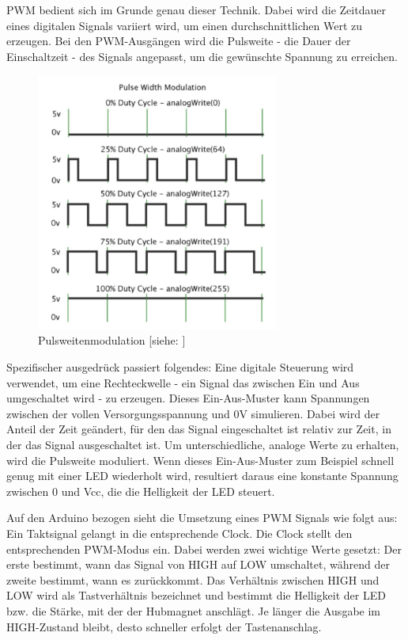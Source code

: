 \ac{PWM} bedient sich im Grunde genau dieser Technik.
Dabei wird die Zeitdauer eines digitalen Signals variiert wird, um einen durchschnittlichen Wert zu erzeugen.
Bei den \ac{PWM}-Ausgängen wird die Pulsweite - die Dauer der Einschaltzeit - des Signals angepasst, um die gewünschte Spannung zu erreichen.

\begin{figure}[htbp]
	\centering
	\includegraphics [width=8cm] {img/pulsweite}
	\caption{Pulsweitenmodulation [siehe: \cite*[siehe ][]{PWM}]}
	\label{fig:pulsweite}
\end{figure}

Spezifischer ausgedrück passiert folgendes:
Eine digitale Steuerung wird verwendet, um eine Rechteckwelle - ein Signal das zwischen Ein und Aus umgeschaltet wird - zu erzeugen.
Dieses Ein-Aus-Muster kann Spannungen zwischen der vollen Versorgungsspannung und 0V simulieren.
Dabei wird der Anteil der Zeit geändert, für den das Signal eingeschaltet ist relativ zur Zeit, in der das Signal ausgeschaltet ist.
Um unterschiedliche, analoge Werte zu erhalten, wird die Pulsweite moduliert.
Wenn dieses Ein-Aus-Muster zum Beispiel schnell genug mit einer LED wiederholt wird, resultiert daraus eine konstante Spannung zwischen 0 und Vcc, die die Helligkeit der LED steuert.

Auf den Arduino bezogen sieht die Umsetzung eines \ac{PWM} Signals wie folgt aus:
Ein Taktsignal gelangt in die entsprechende Clock.
Die Clock stellt den entsprechenden \ac{PWM}-Modus ein.
Dabei werden zwei wichtige Werte gesetzt:
Der erste bestimmt, wann das Signal von HIGH auf LOW umschaltet, während der zweite bestimmt, wann es zurückkommt.
Das Verhältnis zwischen HIGH und LOW wird als Tastverhältnis bezeichnet und bestimmt die Helligkeit der LED bzw. die Stärke, mit der der Hubmagnet anschlägt.
Je länger die Ausgabe im HIGH-Zustand bleibt, desto schneller erfolgt der Tastenanschlag.

